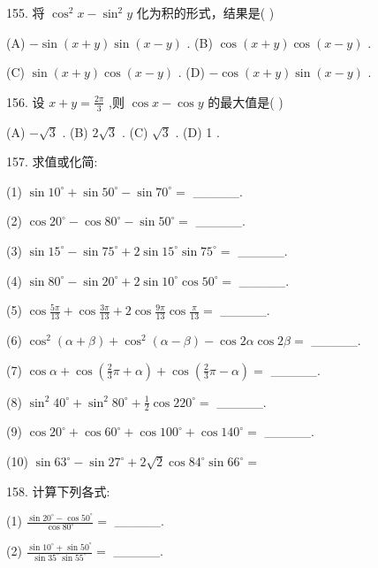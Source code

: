 \documentclass[10pt]{article}
\begin{document}
155. 将 \({\cos }^{2}x - {\sin }^{2}y\) 化为积的形式，结果是( )

(A) \(- \sin \left( {x + y}\right) \sin \left( {x - y}\right)\) . (B) \(\cos \left( {x + y}\right) \cos \left( {x - y}\right)\) .

(C) \(\sin \left( {x + y}\right) \cos \left( {x - y}\right)\) . (D) \(- \cos \left( {x + y}\right) \sin \left( {x - y}\right)\) .

156. 设 \(x + y = \frac{2\pi }{3}\) ,则 \(\cos x - \cos y\) 的最大值是( )

(A) \(- \sqrt{3}\) . (B) \(2\sqrt{3}\) . (C) \(\sqrt{3}\) . (D) 1 .

157. 求值或化简:

(1) \(\sin {10}^{ \circ  } + \sin {50}^{ \circ  } - \sin {70}^{ \circ  } =\) \_\_\_\_\_.

(2) \(\cos {20}^{ \circ  } - \cos {80}^{ \circ  } - \sin {50}^{ \circ  } =\) \_\_\_\_\_.

(3) \(\sin {15}^{ \circ  } - \sin {75}^{ \circ  } + 2\sin {15}^{ \circ  }\sin {75}^{ \circ  } =\) \_\_\_\_\_.

(4) \(\sin {80}^{ \circ  } - \sin {20}^{ \circ  } + 2\sin {10}^{ \circ  }\cos {50}^{ \circ  } =\) \_\_\_\_\_.

(5) \(\cos \frac{5\pi }{13} + \cos \frac{3\pi }{13} + 2\cos \frac{9\pi }{13}\cos \frac{\pi }{13} =\) \_\_\_\_\_.

(6) \({\cos }^{2}\left( {\alpha  + \beta }\right)  + {\cos }^{2}\left( {\alpha  - \beta }\right)  - \cos {2\alpha }\cos {2\beta } =\) \_\_\_\_\_.

(7) \(\cos \alpha  + \cos \left( {\frac{2}{3}\pi  + \alpha }\right)  + \cos \left( {\frac{2}{3}\pi  - \alpha }\right)  =\) \_\_\_\_\_.

(8) \({\sin }^{2}{40}^{ \circ  } + {\sin }^{2}{80}^{ \circ  } + \frac{1}{2}\cos {220}^{ \circ  } =\) \_\_\_\_\_.

(9) \(\cos {20}^{ \circ  } + \cos {60}^{ \circ  } + \cos {100}^{ \circ  } + \cos {140}^{ \circ  } =\) \_\_\_\_\_.

(10) \(\sin {63}^{ \circ  } - \sin {27}^{ \circ  } + 2\sqrt{2}\cos {84}^{ \circ  }\sin {66}^{ \circ  } =\)

158. 计算下列各式:

(1) \(\frac{\sin {20}^{ \circ  } - \cos {50}^{ \circ  }}{\cos {80}^{ \circ  }} =\) \_\_\_\_\_.

(2) \(\frac{\sin {10}^{ \circ  } + \sin {50}^{ \circ  }}{\sin {35}^{ \circ  }\sin {55}^{ \circ  }} =\) \_\_\_\_\_.
\end{document}
